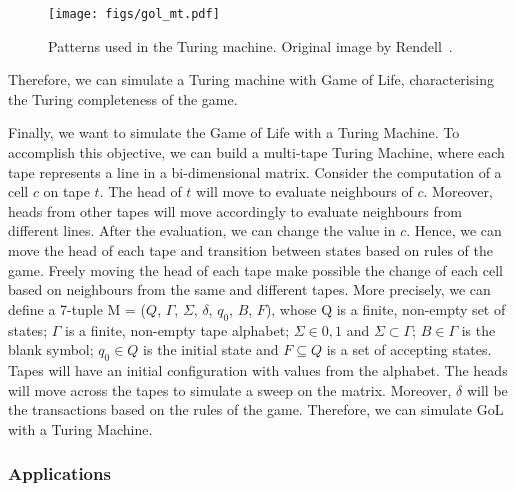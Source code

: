 \documentclass[12pt]{article}
\begin{document}

\begin{figure}[h]
    \centering
    \texttt{[image: figs/gol\_mt.pdf]}
    \caption{Patterns used in the Turing machine. Original image by Rendell~\cite{Rendell:inproc:2011:jul}.}
    \label{fig:gol_mt}
\end{figure}

Therefore, we can simulate a Turing machine with Game of Life, characterising the Turing completeness of the game.

Finally, we want to simulate the Game of Life with a Turing Machine. To accomplish this objective, we can build a multi-tape Turing Machine, where each tape represents a line in a bi-dimensional matrix. Consider the computation of a cell $c$ on tape $t$. The head of $t$ will move to evaluate neighbours of $c$. Moreover, heads from other tapes will move accordingly to evaluate neighbours from different lines. After the evaluation, we can change the value in $c$. Hence, we can move the head of each tape and transition between states based on rules of the game. Freely moving the head of each tape make possible the change of each cell based on neighbours from the same and different tapes. More precisely, we can define a 7-tuple M = ($Q$, $\Gamma$, $\Sigma$, $\delta$, $q_0$, $B$, $F$), whose Q is a finite, non-empty set of states; $\Gamma$ is a finite, non-empty tape alphabet; $\Sigma \in {0,1}$ and $\Sigma \subset \Gamma$; $B \in \Gamma$ is the blank symbol; $q_0 \in Q$ is the initial state and $F \subseteq Q$ is a set of accepting states. Tapes will have an initial configuration with values from the alphabet. The heads will move across the tapes to simulate a sweep on the matrix. Moreover, $\delta$ will be the transactions based on the rules of the game. Therefore, we can simulate GoL with a Turing Machine.


\subsubsection{Applications}
\end{document}
